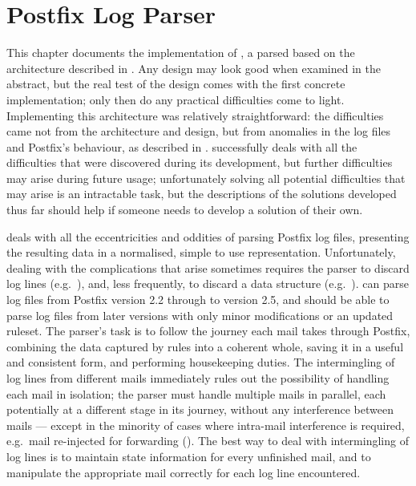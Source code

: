 \chapter{Postfix Log Parser}

\label{Postfix Parser Implementation}

This chapter documents the implementation of \parsername{}, a parsed based
on the architecture described in .  Any
design may look good when examined in the abstract, but the real test of
the design comes with the first concrete implementation; only then do any
practical difficulties come to light.  Implementing this architecture was
relatively straightforward: the difficulties came not from the architecture
and design, but from anomalies in the log files and Postfix's behaviour, as
described in .  \parsername{} successfully deals
with all the difficulties that were discovered during its development, but
further difficulties may arise during future usage; unfortunately solving
all potential difficulties that may arise is an intractable task, but the
descriptions of the solutions developed thus far should help if someone
needs to develop a solution of their own.

\parsername{} deals with all the eccentricities and oddities of parsing
Postfix log files, presenting the resulting data in a normalised, simple to
use representation.  Unfortunately, dealing with the complications that
arise sometimes requires the parser to discard log lines (e.g.\
), and, less frequently, to discard a
data structure (e.g.\ \sectionref{timeouts during data phase}).
\parsername{} can parse log files from Postfix version 2.2 through to
version 2.5, and should be able to parse log files from later versions with
only minor modifications or an updated ruleset.  The parser's task is to
follow the journey each mail takes through Postfix, combining the data
captured by rules into a coherent whole, saving it in a useful and
consistent form, and performing housekeeping duties.  The intermingling of
log lines from different mails immediately rules out the possibility of
handling each mail in isolation; the parser must handle multiple mails in
parallel, each potentially at a different stage in its journey, without any
interference between mails --- except in the minority of cases where
intra-mail interference is required, e.g.\ mail re-injected for forwarding
(\sectionref{Re-injected mails}).  The best way to deal with intermingling
of log lines is to maintain state information for every unfinished mail,
and to manipulate the appropriate mail correctly for each log line
encountered.

